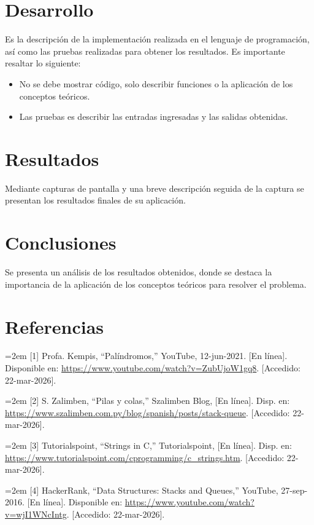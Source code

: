 \documentclass[letterpaper,12pt,oneside]{article}
\begin{document}
\section{Desarrollo}

Es la descripción de la implementación realizada en el lenguaje de programación, así como las pruebas realizadas para obtener los resultados. Es importante resaltar lo siguiente:

\begin{itemize}
\item No se debe mostrar código, solo describir funciones o la aplicación de los conceptos teóricos.
\item Las pruebas es describir las entradas ingresadas y las salidas obtenidas.
\end{itemize}

\section{Resultados}

Mediante capturas de pantalla y una breve descripción seguida de la captura se presentan los resultados finales de su aplicación.

\section{Conclusiones}

Se presenta un análisis de los resultados obtenidos, donde se destaca la importancia de la aplicación de los conceptos teóricos para resolver el problema.

\section*{Referencias}

\noindent
\hangindent=2em
[1] Profa. Kempis, “Palíndromos,” YouTube, 12-jun-2021. [En línea]. Disponible en: \url{https://www.youtube.com/watch?v=ZubUjoW1gq8}. [Accedido: 22-mar-2026].

\medskip

\noindent
\hangindent=2em
[2] S. Zalimben, “Pilas y colas,” Szalimben Blog, [En línea]. Disp. en: \url{https://www.szalimben.com.py/blog/spanish/posts/stack-queue}. [Accedido: 22-mar-2026].

\medskip

\noindent
\hangindent=2em
[3] Tutorialspoint, “Strings in C,” Tutorialspoint, [En línea]. Disp. en: \url{https://www.tutorialspoint.com/cprogramming/c_strings.htm}. [Accedido: 22-mar-2026].

\medskip

\noindent
\hangindent=2em
[4] HackerRank, “Data Structures: Stacks and Queues,” YouTube, 27-sep-2016. [En línea]. Disponible en: \url{https://www.youtube.com/watch?v=wjI1WNcIntg}. [Accedido: 22-mar-2026].
\end{document}
